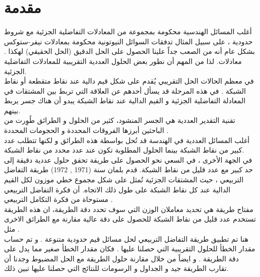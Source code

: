 \chapter*{مقدمة }
أغلب المسائل الهندسية محكومة بمجموعة من المعادلات التفاضلية الجزئية \textbf{} مع شروط حدودية ، على سبيل المثال تدفقات السوائل النيوتونية محكومة بمعادلات نيفر-ستوكس\\ \textbf{  \cite{navier_stokes}}. بشكل عام أنه من الصعب جداً علينا الحصول على الحل الدقيق (الحل الحقيقي) لهكذا معادلات. لذا من المهم أن نطور بعض الحلول العددية التقريبية للمعادلات التفاضلية الجزئية.\\
\noindent
في معظم الحالات الحل التقريبي يُقدم على شكل قيم دالية عند نقاط متقطعة \textbf{} أو نقاط الشبكة \textbf{}. في هذه المرحلة قد يسأل أحدهم عن العلاقة التي تربط بين المشتقات في المعادلة التفاضلية الجزئية و القيم الدالية عند نقاط الشبكة يبدو أن هناك جسر يربط بينهم.\\
\noindent
تقنية التقدير العددية \textbf{} هي الجسر المنشود، كثير من الحلول و الطرائق طُوِرت من الباحثين أبرزها الفروقات المحددة \textbf{ \cite{finite_difference}} و الحجومات المحددة \textbf{ \cite{finite_volume}}.\\
\noindent
أغلب المسائل العددية في الهندسة قد تُحل بواسطة هذه الطرائق و لكنها تتطلب عدد كبير من نقاط الشبكة بينما الحلول المطلوبة تكون عند عدد محدد من نقاط الشبكة.\\
\noindent
في الجهة الأخرى ، في السعي نحو الحصول على طريقة تحقق حلول عددية دقيقة إلى حد كبير مع عدد قليل من نقاط الشبكة. قدم بلمان \textbf{ \cite{Bellman} 
} سنة (1971 , 1972) طريقة التفاضل التربيعي \textbf{}، حيث المشتقات الجزئية تُمثل على شكل مجموع خطي موزون لكل القيم الدالية عند كل نقاط الشبكة على طول ذلك الاتجاه. أن فكرة التفاضل التربيعي مستوحاة من فكرة التكامل التربيعي \textbf{}.\\
\noindent
مفتاح طريقة \textbf{} هي تحديد معاملان الوزن التي سوف تحدد دقة الطريقة، ان هذه الطريقة تستخدم عدد قليل من نقاط الشبكة للحصول على دقة عالية مقارنة مع الطرائق الاخرى مثل \textbf{ \cite{finite_difference}}.\\
\noindent
هنا تم تطبيق طريقة التفاضل التربيعي لحل مسائل قيم حدودية متنوعة . و تم حساب مقدار الخطأ للحلول التقريبية التي حصلنا عليها . فكان مقدار الخطأ صغير مما يدل على دقة الطريقة . و ايضاً من خلال مقارنة حلول الطريقة مع الحل المضبوط وجدنا أن تقارب الطريقة جيد و الجداول و الرسومات للنتائج التي حصلنا عليها تبين ذلك.
\restoregeometry